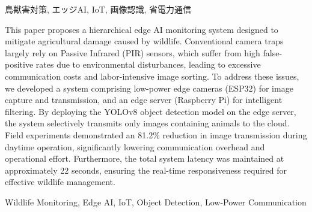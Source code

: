 \documentclass[technicalreport]{ieicej}
\begin{document}
\begin{abstract}
  近年，野生鳥獣による農作物被害は深刻な社会問題となっており，ICTを活用した効率的な監視システムの構築が急務である．
  現状の主力であるPIRセンサを用いた自動撮影カメラ（トレイルカメラ）は，風による植生の揺れや気温変化に起因する誤検知（False Positive）が頻発し，通信コストの増大や画像選別の人的労力が課題となっている．
  本論文では，これらの課題解決に向け，低消費電力な撮影ノードと高機能な解析ノードを組み合わせた「階層型エッジAI監視システム」を提案する．
  本システムは，撮像と転送に特化した省電力エッジカメラ（ESP32）と，深層学習による画像選別を行うエッジサーバ（Raspberry Pi）から構成される．
  エッジサーバ上で物体検出モデルYOLOv8を稼働させ，動物が検出された画像のみをクラウドへ送信することで，通信量を劇的に削減する．
  実フィールドにおける実証実験の結果，誤検知の多い昼間において画像送信量を約81.2\%削減し，システム全体の通信コストおよび運用労力を大幅に改善可能であることを示した．
  また，システム全体の遅延は約22秒に抑えられており，鳥獣害対策に求められる即時性を損なうことなく効率化を実現した．
\end{abstract}

\begin{keyword}
  鳥獣害対策, エッジAI, IoT, 画像認識, 省電力通信
\end{keyword}

\begin{eabstract}
  This paper proposes a hierarchical edge AI monitoring system designed to mitigate agricultural damage caused by wildlife.
  Conventional camera traps largely rely on Passive Infrared (PIR) sensors, which suffer from high false-positive rates due to environmental disturbances, leading to excessive communication costs and labor-intensive image sorting.
  To address these issues, we developed a system comprising low-power edge cameras (ESP32) for image capture and transmission, and an edge server (Raspberry Pi) for intelligent filtering.
  By deploying the YOLOv8 object detection model on the edge server, the system selectively transmits only images containing animals to the cloud.
  Field experiments demonstrated an 81.2\% reduction in image transmission during daytime operation, significantly lowering communication overhead and operational effort.
  Furthermore, the total system latency was maintained at approximately 22 seconds, ensuring the real-time responsiveness required for effective wildlife management.
\end{eabstract}

\begin{ekeyword}
  Wildlife Monitoring, Edge AI, IoT, Object Detection, Low-Power Communication
\end{ekeyword}
\end{document}
